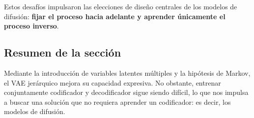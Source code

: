 Estos desafíos impulsaron las elecciones de diseño centrales de los modelos de difusión: \textbf{fijar el proceso hacia adelante y aprender únicamente el proceso inverso}.

\subsection{Resumen de la sección}

Mediante la introducción de variables latentes múltiples y la hipótesis de Markov, el VAE jerárquico mejora su capacidad expresiva. No obstante, entrenar conjuntamente codificador y decodificador sigue siendo difícil, lo que nos impulsa a buscar una solución que no requiera aprender un codificador: es decir, los modelos de difusión.




